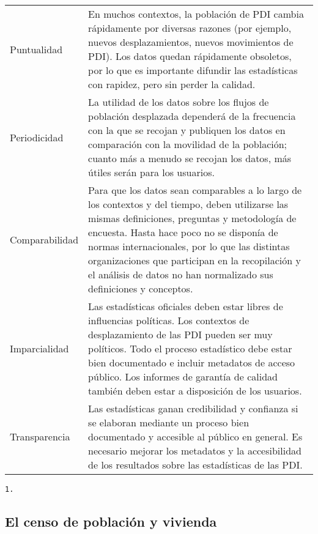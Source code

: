 \documentclass[
]{book}
\begin{document}
\begin{longtable}[]{@{}
  >{\raggedright\arraybackslash}p{}
  >{\raggedright\arraybackslash}p{}@{}}
Puntualidad & En muchos contextos, la población de PDI cambia rápidamente por diversas razones (por ejemplo, nuevos desplazamientos, nuevos movimientos de PDI). Los datos quedan rápidamente obsoletos, por lo que es importante difundir las estadísticas con rapidez, pero sin perder la calidad. \\
Periodicidad & La utilidad de los datos sobre los flujos de población desplazada dependerá de la frecuencia con la que se recojan y publiquen los datos en comparación con la movilidad de la población; cuanto más a menudo se recojan los datos, más útiles serán para los usuarios. \\
Comparabilidad & Para que los datos sean comparables a lo largo de los contextos y del tiempo, deben utilizarse las mismas definiciones, preguntas y metodología de encuesta. Hasta hace poco no se disponía de normas internacionales, por lo que las distintas organizaciones que participan en la recopilación y el análisis de datos no han normalizado sus definiciones y conceptos. \\
Imparcialidad & Las estadísticas oficiales deben estar libres de influencias políticas. Los contextos de desplazamiento de las PDI pueden ser muy políticos. Todo el proceso estadístico debe estar bien documentado e incluir metadatos de acceso público. Los informes de garantía de calidad también deben estar a disposición de los usuarios. \\
Transparencia & Las estadísticas ganan credibilidad y confianza si se elaboran mediante un proceso bien documentado y accesible al público en general. Es necesario mejorar los metadatos y la accesibilidad de los resultados sobre las estadísticas de las PDI. \\
\bottomrule
\end{longtable}

\begin{verbatim}
1.
\end{verbatim}

\hypertarget{el-censo-de-poblaciuxf3n-y-vivienda}{%
\subsection{El censo de población y vivienda}\label{el-censo-de-poblaciuxf3n-y-vivienda}}
\end{document}
